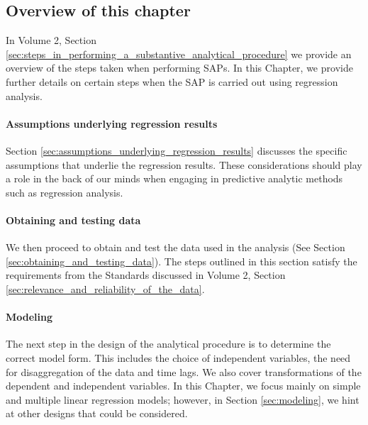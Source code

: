 
\subsection{Overview of this chapter} %
\label{sub:overview_of_this_chapter}

In Volume 2, Section \ref{sec:steps_in_performing_a_substantive_analytical_procedure} we provide an overview of the steps taken when performing SAPs. In this Chapter, we provide further details on certain steps when the SAP is carried out using regression analysis.

\paragraph{Assumptions underlying regression results} %
\label{par:assumptions_underlying_regression_results}

Section \ref{sec:assumptions_underlying_regression_results} discusses the specific assumptions that underlie the regression results. These consi\-derations should play a role in the back of our minds when engaging in predictive analytic methods such as regression analysis.


\paragraph{Obtaining and testing data} %
\label{par:obtaining_and_testing_data}

We then proceed to obtain and test the data used in the analysis (See Section \ref{sec:obtaining_and_testing_data}). The steps outlined in this section satisfy the requirements from the Standards discussed in Volume 2, Section \ref{sec:relevance_and_reliability_of_the_data}.


\paragraph{Modeling} %
\label{par:modeling}

The next step in the design of the analytical procedure is to determine the correct model form. This includes the choice of independent variables, the need for disaggregation of the data and time lags. We also cover transformations of the dependent and independent variables. In this Chapter, we focus mainly on simple and multiple linear regression models; however, in Section \ref{sec:modeling}, we hint at other designs that could be considered. 

